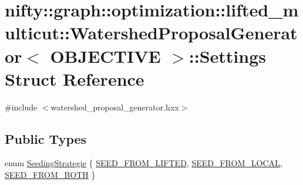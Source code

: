 \hypertarget{structnifty_1_1graph_1_1optimization_1_1lifted__multicut_1_1WatershedProposalGenerator_1_1Settings}{}\section{nifty\+:\+:graph\+:\+:optimization\+:\+:lifted\+\_\+multicut\+:\+:Watershed\+Proposal\+Generator$<$ O\+B\+J\+E\+C\+T\+I\+V\+E $>$\+:\+:Settings Struct Reference}
\label{structnifty_1_1graph_1_1optimization_1_1lifted__multicut_1_1WatershedProposalGenerator_1_1Settings}


{\ttfamily \#include $<$watershed\+\_\+proposal\+\_\+generator.\+hxx$>$}

\subsection*{Public Types}
\begin{DoxyCompactItemize}
\item 
enum \hyperlink{structnifty_1_1graph_1_1optimization_1_1lifted__multicut_1_1WatershedProposalGenerator_1_1Settings_a7c91c0c0f2bb9b179869ee0d433f90ba}{Seeding\+Strategie} \{ \hyperlink{structnifty_1_1graph_1_1optimization_1_1lifted__multicut_1_1WatershedProposalGenerator_1_1Settings_a7c91c0c0f2bb9b179869ee0d433f90baa7fa8df8a1b7d0b874bfd215048b9b307}{S\+E\+E\+D\+\_\+\+F\+R\+O\+M\+\_\+\+L\+I\+F\+T\+E\+D}, 
\hyperlink{structnifty_1_1graph_1_1optimization_1_1lifted__multicut_1_1WatershedProposalGenerator_1_1Settings_a7c91c0c0f2bb9b179869ee0d433f90baad2fd57e474efd3fd6f086b948eefa97e}{S\+E\+E\+D\+\_\+\+F\+R\+O\+M\+\_\+\+L\+O\+C\+A\+L}, 
\hyperlink{structnifty_1_1graph_1_1optimization_1_1lifted__multicut_1_1WatershedProposalGenerator_1_1Settings_a7c91c0c0f2bb9b179869ee0d433f90baa55ce4293b8c25c9f40e398a5c7a68677}{S\+E\+E\+D\+\_\+\+F\+R\+O\+M\+\_\+\+B\+O\+T\+H}
 \}
\end{DoxyCompactItemize}
